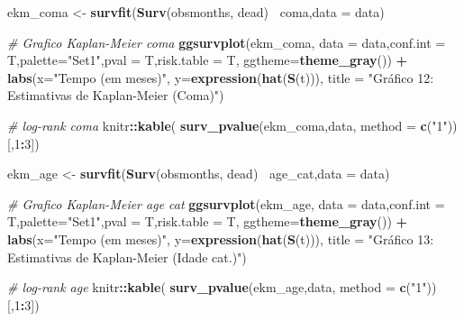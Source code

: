 \documentclass[]{article}
\newenvironment{Shaded}{\begin{snugshade}}{\end{snugshade}}
\newcommand{\KeywordTok}[1]{\textcolor[rgb]{0.13,0.29,0.53}{\textbf{#1}}}
\newcommand{\DataTypeTok}[1]{\textcolor[rgb]{0.13,0.29,0.53}{#1}}
\newcommand{\DecValTok}[1]{\textcolor[rgb]{0.00,0.00,0.81}{#1}}
\newcommand{\StringTok}[1]{\textcolor[rgb]{0.31,0.60,0.02}{#1}}
\newcommand{\CommentTok}[1]{\textcolor[rgb]{0.56,0.35,0.01}{\textit{#1}}}
\newcommand{\OperatorTok}[1]{\textcolor[rgb]{0.81,0.36,0.00}{\textbf{#1}}}
\newcommand{\NormalTok}[1]{#1}
\begin{document}
\begin{Shaded}
\begin{Highlighting}[]
{{\NormalTok{ekm_coma <-}\StringTok{ }\KeywordTok{survfit}\NormalTok{(}\KeywordTok{Surv}\NormalTok{(obsmonths, dead)}\OperatorTok{~}\StringTok{ }\NormalTok{coma,}\DataTypeTok{data =}\NormalTok{ data)}

\CommentTok{# Grafico Kaplan-Meier coma}
\KeywordTok{ggsurvplot}\NormalTok{(ekm_coma, }\DataTypeTok{data =}\NormalTok{ data,}\DataTypeTok{conf.int =}\NormalTok{ T,}\DataTypeTok{palette=}\StringTok{"Set1"}\NormalTok{,}\DataTypeTok{pval =}\NormalTok{ T,}\DataTypeTok{risk.table =}\NormalTok{ T,}
           \DataTypeTok{ggtheme=}\KeywordTok{theme_gray}\NormalTok{()) }\OperatorTok{+}\StringTok{ }
\StringTok{  }\KeywordTok{labs}\NormalTok{(}\DataTypeTok{x=}\StringTok{"Tempo (em meses)"}\NormalTok{,}
       \DataTypeTok{y=}\KeywordTok{expression}\NormalTok{(}\KeywordTok{hat}\NormalTok{(}\KeywordTok{S}\NormalTok{(t))),}
       \DataTypeTok{title =} \StringTok{"Gráfico 12: Estimativas de Kaplan-Meier (Coma)"}\NormalTok{) }

\CommentTok{# log-rank coma}
\NormalTok{knitr}\OperatorTok{::}\KeywordTok{kable}\NormalTok{( }\KeywordTok{surv_pvalue}\NormalTok{(ekm_coma,data, }\DataTypeTok{method =} \KeywordTok{c}\NormalTok{(}\StringTok{"1"}\NormalTok{))[,}\DecValTok{1}\OperatorTok{:}\DecValTok{3}\NormalTok{])}

\NormalTok{ekm_age <-}\StringTok{ }\KeywordTok{survfit}\NormalTok{(}\KeywordTok{Surv}\NormalTok{(obsmonths, dead)}\OperatorTok{~}\StringTok{ }\NormalTok{age_cat,}\DataTypeTok{data =}\NormalTok{ data)}

\CommentTok{# Grafico Kaplan-Meier age cat}
\KeywordTok{ggsurvplot}\NormalTok{(ekm_age, }\DataTypeTok{data =}\NormalTok{ data,}\DataTypeTok{conf.int =}\NormalTok{ T,}\DataTypeTok{palette=}\StringTok{"Set1"}\NormalTok{,}\DataTypeTok{pval =}\NormalTok{ T,}\DataTypeTok{risk.table =}\NormalTok{ T,}
           \DataTypeTok{ggtheme=}\KeywordTok{theme_gray}\NormalTok{()) }\OperatorTok{+}\StringTok{ }
\StringTok{  }\KeywordTok{labs}\NormalTok{(}\DataTypeTok{x=}\StringTok{"Tempo (em meses)"}\NormalTok{,}
       \DataTypeTok{y=}\KeywordTok{expression}\NormalTok{(}\KeywordTok{hat}\NormalTok{(}\KeywordTok{S}\NormalTok{(t))),}
       \DataTypeTok{title =} \StringTok{"Gráfico 13: Estimativas de Kaplan-Meier (Idade cat.)"}\NormalTok{) }

\CommentTok{# log-rank age}
\NormalTok{knitr}\OperatorTok{::}\KeywordTok{kable}\NormalTok{( }\KeywordTok{surv_pvalue}\NormalTok{(ekm_age,data, }\DataTypeTok{method =} \KeywordTok{c}\NormalTok{(}\StringTok{"1"}\NormalTok{))[,}\DecValTok{1}\OperatorTok{:}\DecValTok{3}\NormalTok{])}

}}
\end{Highlighting}
\end{Shaded}
\end{document}
